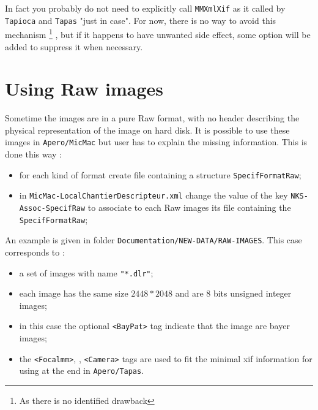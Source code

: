 In fact you probably do not need to explicitly call  {\tt MMXmlXif} as it called by {\tt Tapioca} and {\tt Tapas}
"just in case". For now, there is no way to avoid this mechanism \footnote{As there is no identified drawback}
, but if it happens to have unwanted side effect,
some option will be added to suppress it when necessary.





\section{Using Raw images}

Sometime the images are in a pure Raw format, with no header describing the physical representation
of the image on hard disk. It is possible to use these images in {\tt Apero/MicMac} but user has
to explain the missing information. This is done this way :

\begin{itemize}
       \item for each kind of format create file containing a structure {\tt SpecifFormatRaw};

       \item in {\tt MicMac-LocalChantierDescripteur.xml} change the value of the key {\tt NKS-Assoc-SpecifRaw} to associate to each Raw images its file containing the {\tt SpecifFormatRaw};

\end{itemize}

An example is given in folder {\tt Documentation/NEW-DATA/RAW-IMAGES}. This case corresponds to :


\begin{itemize}

       \item a set of images with name {\tt "*.dlr"};

       \item each image has the same size $2448 * 2048$ and are $8$ bits unsigned integer images;

       \item in this case the optional {\tt <BayPat>} tag indicate that the image are bayer images;

       \item the {\tt <Focalmm>}, {\tt <FocalEqui35>} , {\tt <Camera>} tags are used to fit the minimal
	     xif information for using at the end in {\tt Apero/Tapas}.

\end{itemize}

